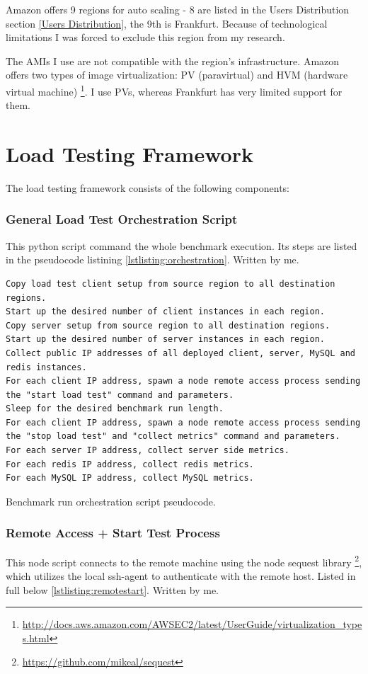 \documentclass{uvamscse}
\begin{document}
Amazon offers 9 regions for auto scaling - 8 are listed in the Users Distribution section \ref{Users Distribution}, the 9th is Frankfurt. Because of technological limitations I was forced to exclude this region from my research.

The AMIs I use are not compatible with the region's infrastructure. Amazon offers two types of image virtualization: PV (paravirtual) and HVM (hardware virtual machine) \footnote{\url{http://docs.aws.amazon.com/AWSEC2/latest/UserGuide/virtualization_types.html}}. I use PVs, whereas Frankfurt has very limited support for them.

\section{Load Testing Framework}\label{Load Testing Framework}
The load testing framework consists of the following components:

\subsubsection{General Load Test Orchestration Script}
This python script command the whole benchmark execution. Its steps are listed in the pseudocode listining \ref{lstlisting:orchestration}. Written by me.

\begin{sourcecode}[H]
\begin{lstlisting}[style=mono]
Copy load test client setup from source region to all destination regions.
Start up the desired number of client instances in each region.
Copy server setup from source region to all destination regions.
Start up the desired number of server instances in each region.
Collect public IP addresses of all deployed client, server, MySQL and redis instances.
For each client IP address, spawn a node remote access process sending
the "start load test" command and parameters.
Sleep for the desired benchmark run length.
For each client IP address, spawn a node remote access process sending
the "stop load test" and "collect metrics" command and parameters.
For each server IP address, collect server side metrics.
For each redis IP address, collect redis metrics.
For each MySQL IP address, collect MySQL metrics.
\end{lstlisting}
\caption{Benchmark run orchestration script pseudocode.}
\label{lstlisting:orchestration}
\end{sourcecode}

\subsubsection{Remote Access + Start Test Process} This node script connects to the remote machine using the node sequest library \footnote{\url{https://github.com/mikeal/sequest}}, which utilizes the local ssh-agent to authenticate with the remote host. Listed in full below \ref{lstlisting:remotestart}. Written by me.
\end{document}
